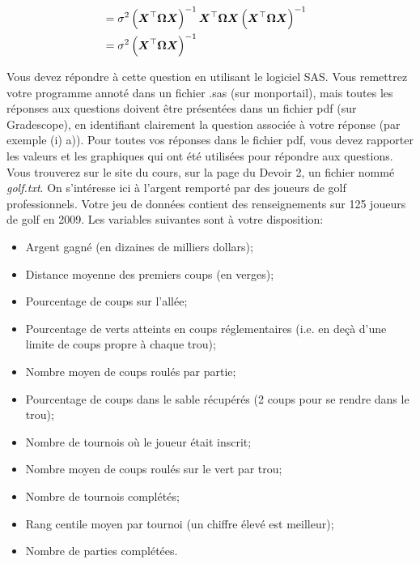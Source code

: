 \begin{questions}
\begin{solution}
\begin{parts}
\begin{subparts}
\begin{align*}
                &= 
                \sigma^2 \left(\boldsymbol{X}^{\top}\boldsymbol{\Omega} \boldsymbol{X}\right)^{-1}  \boldsymbol{X}^{\top}\boldsymbol{\Omega} \boldsymbol{X} \left(\boldsymbol{X}^{\top}\boldsymbol{\Omega} \boldsymbol{X}\right)^{-1}  \cr
                &= 
                \sigma^2 \left(\boldsymbol{X}^{\top}\boldsymbol{\Omega} \boldsymbol{X}\right)^{-1}
            \end{align*}
        \end{subparts}
    \end{parts}
\end{solution}

\vspace{1cm}

\question

Vous devez répondre à cette question en utilisant le logiciel SAS. Vous remettrez votre programme annoté dans un fichier .sas (sur monportail), mais toutes les réponses aux questions doivent être présentées dans un fichier pdf (sur Gradescope), en identifiant clairement la question associée à votre réponse (par exemple (i)
a)). Pour toutes vos réponses dans le fichier pdf, vous devez rapporter les valeurs et les graphiques qui ont été utilisées pour répondre aux questions. \\

Vous trouverez sur le site du cours, sur la page du Devoir 2, un fichier nommé {\it golf.txt}.
On s'intéresse ici à l'argent remporté par des joueurs de golf professionnels. Votre jeu de données contient des renseignements sur 125 joueurs de golf en 2009. Les variables suivantes sont à votre disposition: \\

\begin{itemize}
	\item Argent gagné (en dizaines de milliers dollars); %
	\item Distance moyenne des premiers coups (en verges);
	\item Pourcentage de coups sur l'allée;
	\item Pourcentage de verts atteints en coups réglementaires (i.e. en deçà d'une limite de coups propre à chaque trou);
	\item Nombre moyen de coups roulés par partie;
	\item Pourcentage de coups dans le sable récupérés (2 coups pour se rendre dans le trou);
	\item Nombre de tournois où le joueur était inscrit;
	\item Nombre moyen de coups roulés sur le vert par trou;
	\item Nombre de tournois complétés;
	\item Rang centile moyen par tournoi (un chiffre élevé est meilleur);
	\item Nombre de parties complétées.
\end{itemize}


\end{questions}
